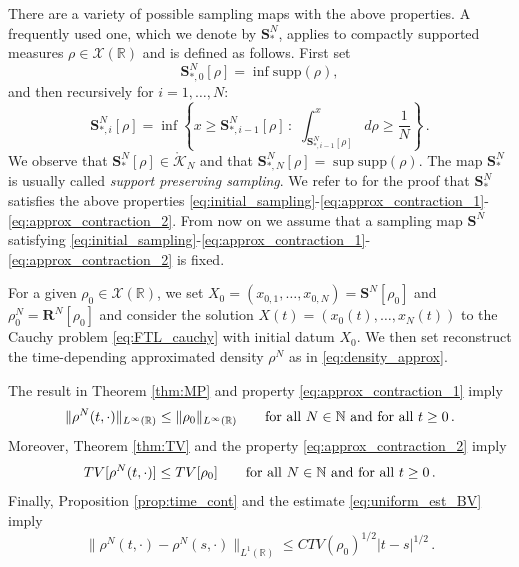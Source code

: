 \documentclass[reqno,oneside]{amsart}
\theoremstyle{plain}
\newcommand{\R}{\mathbb{R}}
\newcommand{\sam}{\mathbf{S}}
\begin{document}
There are a variety of possible sampling maps with the above properties.
A frequently used one, which we denote by $\sam^N_*$,
applies to compactly supported measures $\rho\in \mathcal{X}(\R)$ and is defined as follows.
First set
\begin{equation}\label{eq:sampling_support_0}
    \sam^N_{*,0}[\rho]=\inf{\mathrm{supp}(\rho)},
\end{equation}
and then recursively for $i=1,\ldots,N$:
\begin{equation}\label{eq:sampling_support_i}
   \sam^N_{*,i}[\rho]=\inf\left\{x\geq \sam^N_{*,i-1}[\rho]\,:\,\, \int_{\sam^N_{*,i-1}[\rho]}^x d\rho\geq \frac{1}{N}\right\}\,.
\end{equation}
We observe that $\sam^N_*[\rho]\in \mathring{\mathcal{K}}_N$ and that $\sam^N_{*,N}[\rho]=\sup \mathrm{supp}(\rho)$.
The map $\sam^N_*$ is usually called  \emph{support preserving sampling}. We refer to \cite{DR} for the proof that $\sam^N_\ast$ satisfies the above properties \eqref{eq:initial_sampling}-\eqref{eq:approx_contraction_1}-\eqref{eq:approx_contraction_2}. 
From now on we assume that a sampling map $\sam^N$ satisfying \eqref{eq:initial_sampling}-\eqref{eq:approx_contraction_1}-\eqref{eq:approx_contraction_2} is fixed. 

For a given $\rho_0\in \mathcal{X}(\R)$, we set $X_0=(x_{0,1},\ldots,x_{0,N})=\sam^N[\rho_0]$ and 
$\rho_0^N=\mathbf{R}^N[\rho_0]$ and consider the solution $X(t)=(x_0(t),\ldots,x_N(t))$ to the Cauchy problem \eqref{eq:FTL_cauchy} with initial datum $X_0$. We then set reconstruct the time-depending approximated density $\rho^N$ as in \eqref{eq:density_approx}.

The result in Theorem \ref{thm:MP} and property \eqref{eq:approx_contraction_1} imply
\begin{equation}\label{eq:uniform_est_MP}
    \|\rho^N(t,\cdot)\|_{L^\infty(\R)}\leq \|\rho_0\|_{L^\infty(\R)}\qquad \hbox{for all $N\in \mathbb{N}$ and for all $t\geq 0$}\,.
\end{equation}
Moreover, Theorem \ref{thm:TV} and the property \eqref{eq:approx_contraction_2} imply
\begin{equation}\label{eq:uniform_est_BV}
    TV[\rho^N(t,\cdot)]\leq TV[\rho_0]\qquad \hbox{for all $N\in \mathbb{N}$ and for all $t\geq 0$}\,.
\end{equation}
Finally, Proposition \ref{prop:time_cont} and the estimate \eqref{eq:uniform_est_BV} imply
\begin{equation}\label{eq:equi}
    \|\rho^N(t,\cdot)-\rho^N(s,\cdot)\|_{L^1(\R)}\leq C TV(\rho_0)^{1/2}|t-s|^{1/2}\,.
\end{equation}
\end{document}
